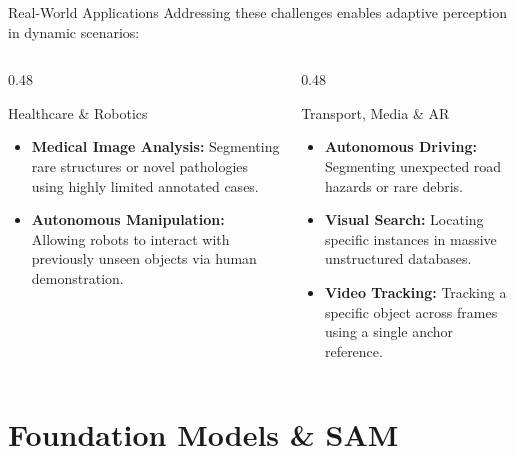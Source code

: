 \documentclass[aspectratio=169, 10pt]{beamer}
\begin{document}
\begin{frame}{Real-World Applications}
    Addressing these challenges enables adaptive perception in dynamic scenarios:
    
    \begin{columns}[T]
        \begin{column}{0.48\textwidth}
            \begin{block}{Healthcare \& Robotics}
                \begin{itemize}
                    \item \textbf{Medical Image Analysis:} Segmenting rare structures or novel pathologies using highly limited annotated cases.
                    \item \textbf{Autonomous Manipulation:} Allowing robots to interact with previously unseen objects via human demonstration.
                \end{itemize}
            \end{block}
        \end{column}
        
        \begin{column}{0.48\textwidth}
            \begin{block}{Transport, Media \& AR}
                \begin{itemize}
                    \item \textbf{Autonomous Driving:} Segmenting unexpected road hazards or rare debris.
                    \item \textbf{Visual Search:} Locating specific instances in massive unstructured databases.
                    \item \textbf{Video Tracking:} Tracking a specific object across frames using a single anchor reference.
                \end{itemize}
            \end{block}
        \end{column}
    \end{columns}
\end{frame}

\section{Foundation Models \& SAM}
\end{document}
